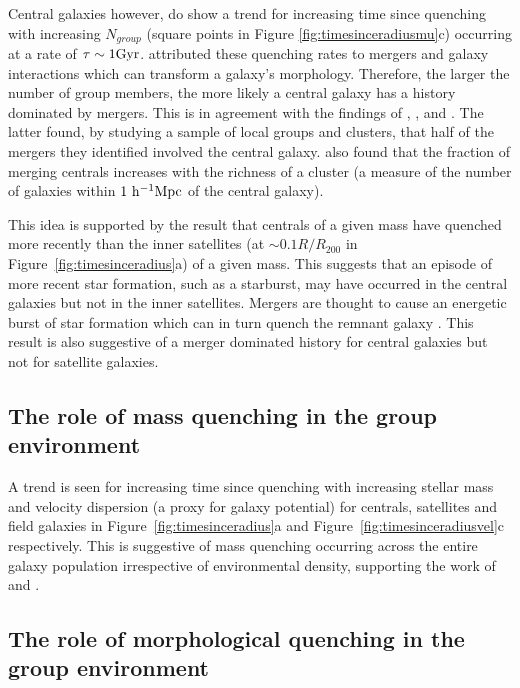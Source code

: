 \documentclass[useAMS,usenatbib]{mn2e}
\begin{document}
Central galaxies however, do show a trend for increasing time since quenching with increasing $N_{group}$ (square points in Figure \ref{fig:timesinceradiusmu}c) occurring at a rate of $\tau \sim 1 \rm{Gyr}$. \cite{smethurst15} attributed these quenching rates to mergers and galaxy interactions which can transform a galaxy's morphology. Therefore, the larger the number of group members, the more likely a central galaxy has a history dominated by mergers. This is in agreement with the findings of \citet{lin10}, \citet{ellison10}, \citet{lidman13} and \citet{mcintosh08}. The latter found, by studying a sample of local groups and clusters, that half of the mergers they identified involved the central galaxy. \cite{liu09} also found that the fraction of merging centrals increases with the richness of a cluster (a measure of the number of galaxies within $1~\rm{h}^{-1}\rm{Mpc}$ of the central galaxy).

This idea is supported by the result that centrals of a given mass have quenched more recently than the inner satellites (at $\sim0.1R/R_{200}$ in Figure~\ref{fig:timesinceradius}a) of a given mass. This suggests that an episode of more recent star formation, such as a starburst, may have occurred in the central galaxies but not in the inner satellites. Mergers are thought to cause an energetic burst of star formation which can in turn quench the remnant galaxy \citep{hopkins05, treister12, pontzen16}. This result is also suggestive of a merger dominated history for central galaxies but not for satellite galaxies.

\subsection{The role of mass quenching in the group environment}\label{sec:rolemassenv}

A trend is seen for increasing time since quenching with increasing stellar mass and velocity dispersion (a proxy for galaxy potential) for centrals, satellites and field galaxies in Figure~\ref{fig:timesinceradius}a and Figure~\ref{fig:timesinceradiusvel}c respectively. This is suggestive of mass quenching occurring across the entire galaxy population irrespective of environmental density, supporting the work of \citet{peng10, peng12, Gabor10} and \citet{darvish16}.

\subsection{The role of morphological quenching in the group environment}\label{sec:rolemorphenv}
\end{document}
